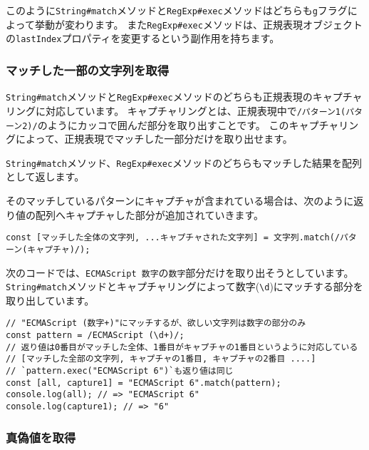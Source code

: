 このように\texttt{String\#match}メソッドと\texttt{RegExp\#exec}メソッドはどちらも\texttt{g}フラグによって挙動が変わります。
また\texttt{RegExp\#exec}メソッドは、正規表現オブジェクトの\texttt{lastIndex}プロパティを変更するという副作用を持ちます。

\hypertarget{match-capture-by-regexp}{%
\subsubsection{マッチした一部の文字列を取得}\label{match-capture-by-regexp}}

\texttt{String\#match}メソッドと\texttt{RegExp\#exec}メソッドのどちらも正規表現のキャプチャリングに対応しています。
キャプチャリングとは、正規表現中で\texttt{/パターン1(パターン2)/}のようにカッコで囲んだ部分を取り出すことです。
このキャプチャリングによって、正規表現でマッチした一部分だけを取り出せます。

\texttt{String\#match}メソッド、\texttt{RegExp\#exec}メソッドのどちらもマッチした結果を配列として返します。

そのマッチしているパターンにキャプチャが含まれている場合は、次のように返り値の配列へキャプチャした部分が追加されていきます。

\begin{lstlisting}
const [マッチした全体の文字列, ...キャプチャされた文字列] = 文字列.match(/パターン(キャプチャ)/);
\end{lstlisting}

次のコードでは、\texttt{ECMAScript 数字}の\texttt{数字}部分だけを取り出そうとしています。
\texttt{String\#match}メソッドとキャプチャリングによって数字(\texttt{\textbackslash d})にマッチする部分を取り出しています。

\begin{lstlisting}
// "ECMAScript (数字+)"にマッチするが、欲しい文字列は数字の部分のみ
const pattern = /ECMAScript (\d+)/;
// 返り値は0番目がマッチした全体、1番目がキャプチャの1番目というように対応している
// [マッチした全部の文字列, キャプチャの1番目, キャプチャの2番目 ....]
// `pattern.exec("ECMAScript 6")`も返り値は同じ
const [all, capture1] = "ECMAScript 6".match(pattern);
console.log(all); // => "ECMAScript 6"
console.log(capture1); // => "6"
\end{lstlisting}

\hypertarget{test-by-regexp}{%
\subsubsection{真偽値を取得}\label{test-by-regexp}}

